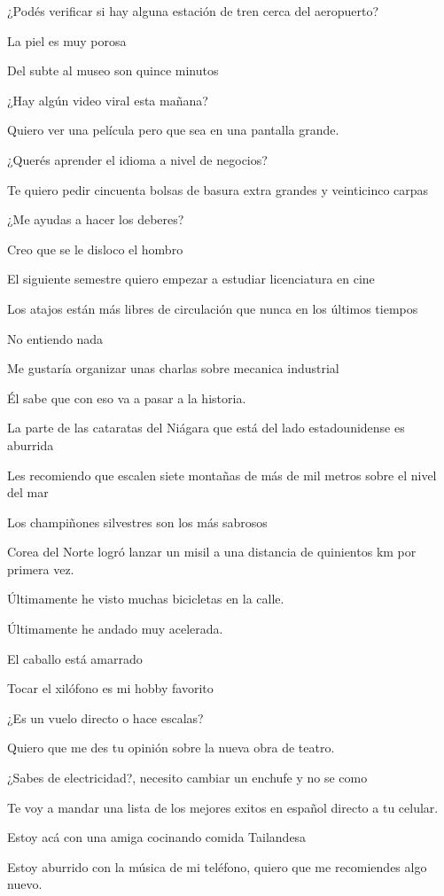¿Podés verificar si hay alguna estación de tren cerca del aeropuerto?

La piel es muy porosa

Del subte al museo son quince minutos

¿Hay algún video viral esta mañana?

Quiero ver una película pero que sea en una pantalla grande.

¿Querés aprender el idioma a nivel de negocios?

Te quiero pedir cincuenta bolsas de basura extra grandes y veinticinco carpas

¿Me ayudas a hacer los deberes?

Creo que se le disloco el hombro

El siguiente semestre quiero empezar a estudiar licenciatura en cine

Los atajos están más libres de circulación que nunca en los últimos tiempos

No entiendo nada

Me gustaría organizar unas charlas sobre mecanica industrial

Él sabe que con eso va a pasar a la historia.

La parte de las cataratas del Niágara que está del lado estadounidense es aburrida

Les recomiendo que escalen siete montañas de más de mil metros sobre el nivel del mar

Los champiñones silvestres son los más sabrosos

Corea del Norte logró lanzar un misil a una distancia de quinientos km por primera vez.

Últimamente he visto muchas bicicletas en la calle.

Últimamente he andado muy acelerada.

El caballo está amarrado

Tocar el xilófono es mi hobby favorito

¿Es un vuelo directo o hace escalas?

Quiero que me des tu opinión sobre la nueva obra de teatro.

¿Sabes de electricidad?, necesito cambiar un enchufe y no se como

Te voy a mandar una lista de los mejores exitos en español directo a tu celular.

Estoy acá con una amiga cocinando comida Tailandesa

Estoy aburrido con la música de mi teléfono, quiero que me recomiendes algo nuevo.

